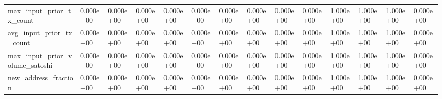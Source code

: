 \begin{table}
\begin{tabular}{llllllllllllll}
max\_input\_prior\_tx\_count & 0.000e+00 & 0.000e+00 & 0.000e+00 & 0.000e+00 & 0.000e+00 & 0.000e+00 & 0.000e+00 & 0.000e+00 & 0.000e+00 & 1.000e+00 & 1.000e+00 & 1.000e+00 & 0.000e+00 \\
avg\_input\_prior\_tx\_count & 0.000e+00 & 0.000e+00 & 0.000e+00 & 0.000e+00 & 0.000e+00 & 0.000e+00 & 0.000e+00 & 0.000e+00 & 0.000e+00 & 1.000e+00 & 1.000e+00 & 1.000e+00 & 0.000e+00 \\
max\_input\_prior\_volume\_satoshi & 0.000e+00 & 0.000e+00 & 0.000e+00 & 0.000e+00 & 0.000e+00 & 0.000e+00 & 0.000e+00 & 0.000e+00 & 0.000e+00 & 1.000e+00 & 1.000e+00 & 1.000e+00 & 0.000e+00 \\
new\_address\_fraction & 0.000e+00 & 0.000e+00 & 0.000e+00 & 0.000e+00 & 0.000e+00 & 0.000e+00 & 0.000e+00 & 0.000e+00 & 0.000e+00 & 1.000e+00 & 1.000e+00 & 1.000e+00 & 0.000e+00 \\
\bottomrule
\end{tabular}
\end{table}
